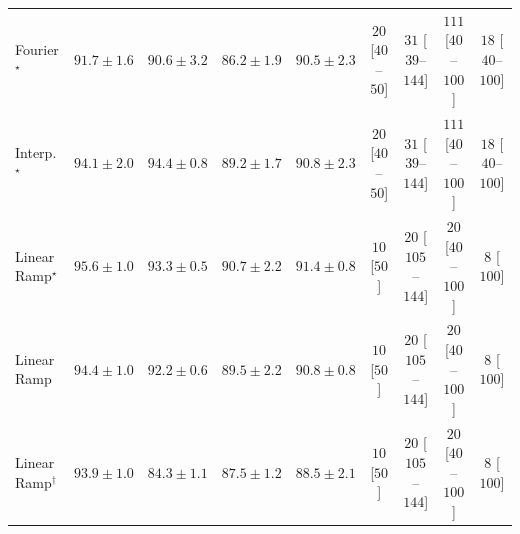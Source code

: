 \begin{tabular}{l|cccc|cccc|}
Fourier$^\star$ & {\cellcolor[HTML]{066D39}} \color[HTML]{F1F1F1} $91.7\pm 1.6$ & {\cellcolor[HTML]{0C723B}} \color[HTML]{F1F1F1} $90.6\pm 3.2$ & {\cellcolor[HTML]{268846}} \color[HTML]{F1F1F1} $86.2\pm 1.9$ & {\cellcolor[HTML]{0C723B}} \color[HTML]{F1F1F1} $90.5\pm 2.3$ & {\cellcolor[HTML]{FFF3EF}} \color[HTML]{000000} $20$ [$40$--$50$] & {\cellcolor[HTML]{FEF1ED}} \color[HTML]{000000} $31$ [$39$--$144$] & {\cellcolor[HTML]{FDDDD9}} \color[HTML]{000000} $111$ [$40$--$100$] & {\cellcolor[HTML]{FFF3F0}} \color[HTML]{000000} $18$ [$40$--$100$] \\
Interp.$^\star$ & {\cellcolor[HTML]{005E33}} \color[HTML]{F1F1F1} $94.1\pm 2.0$ & {\cellcolor[HTML]{005D33}} \color[HTML]{F1F1F1} $94.4\pm 0.8$ & {\cellcolor[HTML]{15793E}} \color[HTML]{F1F1F1} $89.2\pm 1.7$ & {\cellcolor[HTML]{0B713B}} \color[HTML]{F1F1F1} $90.8\pm 2.3$ & {\cellcolor[HTML]{FFF3EF}} \color[HTML]{000000} $20$ [$40$--$50$] & {\cellcolor[HTML]{FEF1ED}} \color[HTML]{000000} $31$ [$39$--$144$] & {\cellcolor[HTML]{FDDDD9}} \color[HTML]{000000} $111$ [$40$--$100$] & {\cellcolor[HTML]{FFF3F0}} \color[HTML]{000000} $18$ [$40$--$100$] \\
Linear Ramp$^\star$ & {\cellcolor[HTML]{005530}} \color[HTML]{F1F1F1} $95.6\pm 1.0$ & {\cellcolor[HTML]{006435}} \color[HTML]{F1F1F1} $93.3\pm 0.5$ & {\cellcolor[HTML]{0B713B}} \color[HTML]{F1F1F1} $90.7\pm 2.2$ & {\cellcolor[HTML]{076D39}} \color[HTML]{F1F1F1} $91.4\pm 0.8$ & {\cellcolor[HTML]{FFF6F2}} \color[HTML]{000000} $10$ [$50$] & {\cellcolor[HTML]{FFF3EF}} \color[HTML]{000000} $20$ [$105$--$144$] & {\cellcolor[HTML]{FFF3EF}} \color[HTML]{000000} $20$ [$40$--$100$] & {\cellcolor[HTML]{FFF6F2}} \color[HTML]{000000} $8$ [$100$] \\
Linear Ramp & {\cellcolor[HTML]{005D33}} \color[HTML]{F1F1F1} $94.4\pm 1.0$ & {\cellcolor[HTML]{026A38}} \color[HTML]{F1F1F1} $92.2\pm 0.6$ & {\cellcolor[HTML]{13773D}} \color[HTML]{F1F1F1} $89.5\pm 2.2$ & {\cellcolor[HTML]{0B713B}} \color[HTML]{F1F1F1} $90.8\pm 0.8$ & {\cellcolor[HTML]{FFF6F2}} \color[HTML]{000000} $10$ [$50$] & {\cellcolor[HTML]{FFF3EF}} \color[HTML]{000000} $20$ [$105$--$144$] & {\cellcolor[HTML]{FFF3EF}} \color[HTML]{000000} $20$ [$40$--$100$] & {\cellcolor[HTML]{FFF6F2}} \color[HTML]{000000} $8$ [$100$] \\
Linear Ramp$^\dagger$ & {\cellcolor[HTML]{006034}} \color[HTML]{F1F1F1} $93.9\pm 1.0$ & {\cellcolor[HTML]{30954F}} \color[HTML]{F1F1F1} $84.3\pm 1.1$ & {\cellcolor[HTML]{1F8142}} \color[HTML]{F1F1F1} $87.5\pm 1.2$ & {\cellcolor[HTML]{197C40}} \color[HTML]{F1F1F1} $88.5\pm 2.1$ & {\cellcolor[HTML]{FFF6F2}} \color[HTML]{000000} $10$ [$50$] & {\cellcolor[HTML]{FFF3EF}} \color[HTML]{000000} $20$ [$105$--$144$] & {\cellcolor[HTML]{FFF3EF}} \color[HTML]{000000} $20$ [$40$--$100$] & {\cellcolor[HTML]{FFF6F2}} \color[HTML]{000000} $8$ [$100$] \\

\end{tabular}

